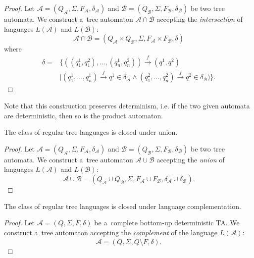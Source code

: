 \begin{proof}
Let $\mathcal{A} = (Q_\mathcal{A}, \Sigma, F_\mathcal{A}, \delta_\mathcal{A})$
and $\mathcal{B} = (Q_\mathcal{B}, \Sigma, F_\mathcal{B}, \delta_\mathcal{B})$
be two tree automata. We construct a~tree automaton $\mathcal{A} \cap
\mathcal{B}$ accepting the \emph{intersection} of languages $L(\mathcal{A})$ and
$L(\mathcal{B})$:
\begin{equation}
\mathcal{A} \cap \mathcal{B}
= (Q_\mathcal{A} \times Q_\mathcal{B}, \Sigma, F_\mathcal{A} \times
F_\mathcal{B},\delta) \end{equation} where
 \begin{align}
 \delta = &\{
 ((q^1_1,q^2_1),\ldots,(q^1_n,q^2_n)) \overset{f}{\longrightarrow} (q^1,
 q^2)\nonumber \\
  & \mid (q^1_1,\ldots,q^1_n) \overset{f}{\longrightarrow} q^1 \in
  \delta_{\mathcal{A}} \wedge (q^2_1,\ldots,q^2_n) \overset{f}{\longrightarrow}
  q^2 \in \delta_{\mathcal{B}})\}.
	\end{align}
\end{proof}

Note that this construction preserves determinism, i.e. if the two given
automata are deterministic, then so is the product automaton.
\begin{theorem}
 The class of regular tree languages is closed under union.
\end{theorem}

\begin{proof}
Let $\mathcal{A} = (Q_\mathcal{A}, \Sigma, F_\mathcal{A}, \delta_\mathcal{A})$
and $\mathcal{B} = (Q_\mathcal{B}, \Sigma, F_\mathcal{B}, \delta_\mathcal{B})$
be two tree automata. We construct a~tree automaton $\mathcal{A} \cup
\mathcal{B}$ accepting the \emph{union} of languages $L(\mathcal{A})$ and
$L(\mathcal{B})$:
\begin{equation}
\mathcal{A} \cup
\mathcal{B} = (Q_\mathcal{A} \cup Q_\mathcal{B}, \Sigma, F_\mathcal{A} \cup
F_\mathcal{B}, \delta_\mathcal{A} \cup \delta_\mathcal{B}).
\end{equation}
\end{proof}

\begin{theorem}
 The class of regular tree languages is closed under language complementation.
\end{theorem}

\begin{proof}
Let $\mathcal{A} = (Q, \Sigma, F, \delta)$ be a~complete bottom-up deterministic
TA. We construct a~tree automaton accepting the \emph{complement} of the
language $L(\mathcal{A})$:
\begin{equation}
\overline{\mathcal{A}} = (Q, \Sigma, Q \setminus F, \delta).
\end{equation}
\end{proof}

